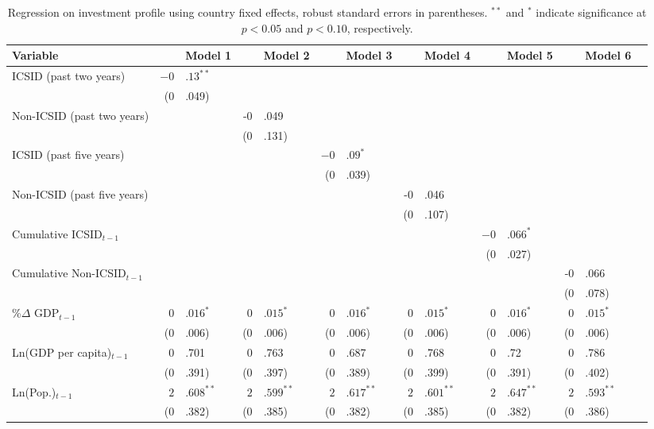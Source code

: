 \documentclass[12pt,onesided]{amsart}
\begin{document}
\begin{table}[ht]
\centering
\caption{Regression on investment profile using country fixed effects, robust standard errors in parentheses. $^{**}$ and $^{*}$ indicate significance at $p< 0.05 $ and $p< 0.10 $, respectively.} 
\label{tab:dispRepLevel}
{\footnotesize
\begin{tabular}{lr@{} lr@{}lr@{}lr@{} lr@{}lr@{}lr@{} }
 Variable && Model 1 && Model 2 && Model 3 && Model 4 && Model 5 && Model 6 \\ 
  \hline
\hline
ICSID (past two years) & $-0$&$.13^{\ast\ast}$ &&  &&  &&  &&  &&  \\ 
   & (0&.049) &&  &&  &&  &&  &&  \\ 
  Non-ICSID (past two years) &&  & -0&.049 &&  &&  &&  &&  \\ 
   &&  & (0&.131) &&  &&  &&  &&  \\ 
  ICSID (past five years) &&  &&  & $-0$&$.09^{\ast}$ &&  &&  &&  \\ 
   && &&  & (0&.039) &&  &&  &&  \\ 
  Non-ICSID (past five years) &&  &&  &&  & -0&.046 &&  &&  \\ 
   &&  &&  &&  & (0&.107) &&  &&  \\    
  Cumulative ICSID$_{t-1}$ &&  &&  &&  &&  & $-0$&$.066^{\ast}$ &&  \\ 
   &&  &&  &&  &&  & (0&.027) &&  \\ 
  Cumulative Non-ICSID$_{t-1}$ &&  &&  &&  &&  &&  & -0&.066 \\ 
   && &&  &&  &&  &&  & (0&.078) \\    
  \%$\Delta$ GDP$_{t-1}$ & $0$&$.016^{\ast}$ & $0$&$.015^{\ast}$ & $0$&$.016^{\ast}$ & $0$&$.015^{\ast}$ & $0$&$.016^{\ast}$ & $0$&$.015^{\ast}$ \\ 
   & (0&.006) & (0&.006) & (0&.006) & (0&.006) & (0&.006) & (0&.006) \\ 
  Ln(GDP per capita)$_{t-1}$ & 0&.701 & 0&.763 & 0&.687 & 0&.768 & 0&.72 & 0&.786 \\ 
   & (0&.391) & (0&.397) & (0&.389) & (0&.399) & (0&.391) & (0&.402) \\ 
  Ln(Pop.)$_{t-1}$ & $2$&$.608^{\ast\ast}$ & $2$&$.599^{\ast\ast}$ & $2$&$.617^{\ast\ast}$ & $2$&$.601^{\ast\ast}$ & $2$&$.647^{\ast\ast}$ & $2$&$.593^{\ast\ast}$ \\ 
   & (0&.382) & (0&.385) & (0&.382) & (0&.385) & (0&.382) & (0&.386) \\ 

\end{tabular}}
\end{table}
\end{document}
